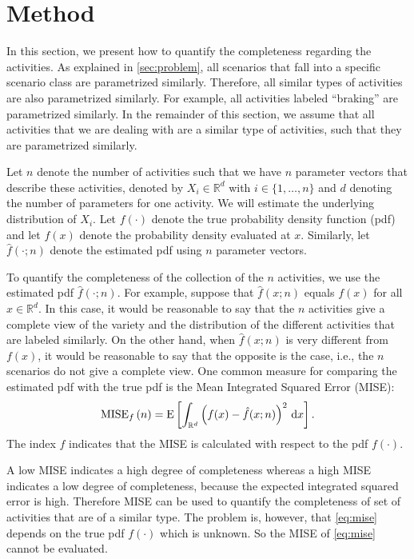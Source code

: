 \section{Method}
\label{sec:method}

In this section, we present how to quantify the completeness regarding the activities. As explained in \cref{sec:problem}, all scenarios that fall into a specific scenario class are parametrized similarly. Therefore, all similar types of activities are also parametrized similarly. For example, all activities labeled ``braking'' are parametrized similarly. In the remainder of this section, we assume that all activities that we are dealing with are a similar type of activities, such that they are parametrized similarly. 

Let $n$ denote the number of activities such that we have $n$ parameter vectors that describe these activities, denoted by $X_i \in \mathbb{R}^d$ with $i\in \{1,\ldots,n\}$ and $d$ denoting the number of parameters for one activity. We will estimate the underlying distribution of $X_i$. Let $f(\cdot)$ denote the true probability density function (pdf) and let $f(x)$ denote the probability density evaluated at $x$. Similarly, let $\hat{f}(\cdot;n)$ denote the estimated pdf using $n$ parameter vectors.

To quantify the completeness of the collection of the $n$ activities, we use the estimated pdf $\hat{f}(\cdot;n)$. For example, suppose that $\hat{f}(x;n)$ equals $f(x)$ for all $x \in \mathbb{R}^d$. In this case, it would be reasonable to say that the $n$ activities give a complete view of the variety and the distribution of the different activities that are labeled similarly. On the other hand, when $\hat{f}(x;n)$ is very different from $f(x)$, it would be reasonable to say that the opposite is the case, i.e., the $n$ scenarios do not give a complete view. One common measure for comparing the estimated pdf with the true pdf is the Mean Integrated Squared Error (MISE):
\begin{equation}
	\label{eq:mise}
	\textup{MISE}_{f}\left( n \right) = \textup{E} \left[ \int_{\mathbb{R}^d} \left( f(x) - \hat{f}(x;n) \right)^2 \mathrm{\,d} x \right].
\end{equation}
The index $f$ indicates that the MISE is calculated with respect to the pdf $f(\cdot)$.

A low MISE indicates a high degree of completeness whereas a high MISE indicates a low degree of completeness, because the expected integrated squared error is high. Therefore MISE can be used to quantify the completeness of set of activities that are of a similar type. The problem is, however, that \cref{eq:mise} depends on the true pdf $f(\cdot)$ which is unknown. So the MISE of \cref{eq:mise} cannot be evaluated.

